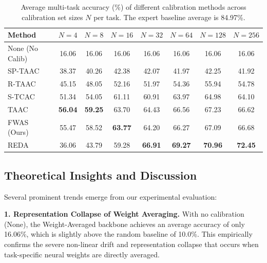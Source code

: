 \documentclass{article}
\theoremstyle{plain}
\theoremstyle{definition}
\theoremstyle{remark}
\begin{document}
\begin{table}[t]
\centering
\caption{Average multi-task accuracy (\%) of different calibration methods across calibration set sizes $N$ per task. The expert baseline average is 84.97\%.}
\label{tab:sweep_results}
\vskip 0.15in
\begin{small}
\begin{sc}
\begin{tabular}{lccccccc}
\toprule
Method & $N=4$ & $N=8$ & $N=16$ & $N=32$ & $N=64$ & $N=128$ & $N=256$ \\
\midrule
None (No Calib) & 16.06 & 16.06 & 16.06 & 16.06 & 16.06 & 16.06 & 16.06 \\
SP-TAAC         & 38.37 & 40.26 & 42.38 & 42.07 & 41.97 & 42.25 & 41.92 \\
R-TAAC          & 45.15 & 48.05 & 52.16 & 51.97 & 54.36 & 55.94 & 54.78 \\
S-TCAC          & 51.34 & 54.05 & 61.11 & 60.91 & 63.97 & 64.98 & 64.10 \\
TAAC            & \textbf{56.04} & \textbf{59.25} & 63.70 & 64.43 & 66.56 & 67.23 & 66.62 \\
FWAS (Ours)     & 55.47 & 58.52 & \textbf{63.77} & 64.20 & 66.27 & 67.09 & 66.68 \\
REDA            & 36.06 & 43.79 & 59.28 & \textbf{66.91} & \textbf{69.27} & \textbf{70.96} & \textbf{72.45} \\
\bottomrule
\end{tabular}
\end{sc}
\end{small}
\vskip -0.1in
\end{table}

\subsection{Theoretical Insights and Discussion}

Several prominent trends emerge from our experimental evaluation:

\textbf{1. Representation Collapse of Weight Averaging.} With no calibration (None), the Weight-Averaged backbone achieves an average accuracy of only 16.06\%, which is slightly above the random baseline of 10.0\%. This empirically confirms the severe non-linear drift and representation collapse that occurs when task-specific neural weights are directly averaged.
\end{document}
